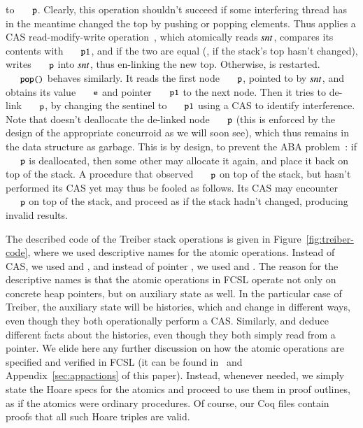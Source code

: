 to $\eesc{p}$. Clearly, this operation shouldn't succeed if some
interfering thread has in the meantime changed the top by pushing or
popping elements. Thus  applies a CAS read-modify-write
operation~\cite{Herlihy-Shavit:08}, which atomically reads $\mathit{snt}$,
compares its contents with $\eesc{p1}$, and if the two are equal (\ie,
if the stack's top hasn't changed), writes $\eesc{p}$ into $\mathit{snt}$,
thus en-linking the new top. Otherwise,  is restarted.
%
$\code{pop()}$ behaves similarly. It reads the first node $\code{p}$,
pointed to by $\mathit{snt}$, and obtains its value $\eesc{e}$ and pointer
$\eesc{p1}$ to the next node. Then it tries to de-link $\code{p}$, by
changing the sentinel to $\eesc{p1}$ using a CAS to identify
interference. Note that  doesn't deallocate the de-linked
node $\eesc{p}$ (this is enforced by the design of the appropriate
concurroid as we will soon see), which thus remains in the data
structure as garbage. This is by design, to prevent the ABA
problem~\cite[\S10]{Herlihy-Shavit:08}: if $\eesc{p}$ is deallocated,
then some other  may allocate it again, and place it back
on top of the stack. A procedure that observed $\eesc{p}$ on top of
the stack, but hasn't performed its CAS yet may thus be fooled as
follows. Its CAS may encounter $\eesc{p}$ on top of the stack, and
proceed as if the stack hadn't changed, producing invalid results.

The described code of the Treiber stack operations is given in
Figure~\ref{fig:treiber-code}, where we used descriptive names for the
atomic operations. Instead of CAS, we used  and
, and instead of pointer , we used
 and . The reason for the
descriptive names is that the atomic operations in FCSL operate not
only on concrete heap pointers, but on auxiliary state as well. In the
particular case of Treiber, the auxiliary state will be histories,
which  and  change in different ways, even
though they both operationally perform a CAS. Similarly,
 and  deduce different facts about
the histories, even though they both simply read from a pointer.
%
We elide here any further discussion on how the atomic operations are
specified and verified in FCSL (it can be found
in~\cite{Nanevski-al:ESOP14} and Appendix~\ref{sec:appactions} of this
paper). Instead, whenever needed, we simply state the Hoare specs for
the atomics and proceed to use them in proof outlines, as if the
atomics were ordinary procedures. Of course, our Coq files contain
proofs that all such Hoare triples are valid.

